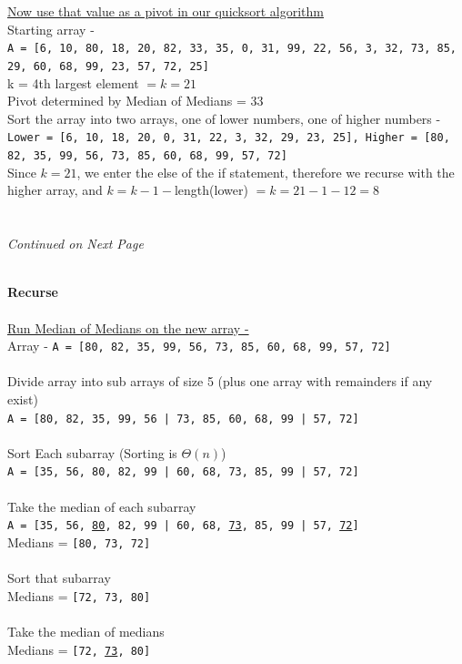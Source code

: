 \documentclass[9pt]{article}
\begin{document}
\begin{center}
		\phantom{"nothing"}\\\phantom{"nothing"}\\ \underline{Now use that value as a pivot in our quicksort algorithm}\\
		Starting array - \\
	\texttt{A = [6, 10, 80, 18, 20, 82, 33, 35, 0, 31, 99, 22, 56, 3, 32, 73, 85, 29, 60, 68, 99, 23, 57, 72, 25]}
		\\k = 4th largest element $ = k = 21$
		\\Pivot determined by Median of Medians = 33\\
		Sort the array into two arrays, one of lower numbers, one of higher numbers -\\
		\texttt{Lower = [6, 10, 18, 20, 0, 31, 22, 3, 32, 29, 23, 25], Higher = [80, 82, 35, 99, 56, 73, 85, 60, 68, 99, 57, 72]}\\
		Since $k=21$, we enter the else of the if statement, therefore we recurse with the higher array, and $k = k-1 - $length(lower) $ = k = 21 - 1 - 12 = 8$\\
		\phantom{"nothing"}\\\phantom{"nothing"}\\\textit{Continued on Next Page}
		
		\newpage\phantom{"nothing"}\\\textbf{Recurse}\\
		\phantom{"nothing"}\\
		\underline{Run Median of Medians on the new array - }\\
		Array - \texttt{A = [80, 82, 35, 99, 56, 73, 85, 60, 68, 99, 57, 72]}\\
		\phantom{"nothing"}\\Divide array into sub arrays of size 5 (plus one array with remainders if any exist)
		\\\texttt{A = [80, 82, 35, 99, 56 | 73, 85, 60, 68, 99 | 57, 72]}
		\\\phantom{"nothing"}\\Sort Each subarray (Sorting is $\Theta (n)$)
		\\\texttt{A = [35, 56, 80, 82, 99 | 60, 68, 73, 85, 99 | 57, 72]}
		\\\phantom{"nothing"}\\Take the median of each subarray
		\\\texttt{A = [35, 56, \underline{80}, 82, 99 | 60, 68, \underline{73}, 85, 99 | 57, \underline{72}]}
		\\Medians = \texttt{[80, 73, 72]}
		\\\phantom{"nothing"}\\Sort that subarray
		\\Medians = \texttt{[72, 73, 80]}
		\\\phantom{"nothing"}\\Take the median of medians
		\\Medians = \texttt{[72, \underline{73}, 80]}
		\\\phantom{"nothing"}\\



\end{center}
\end{document}
